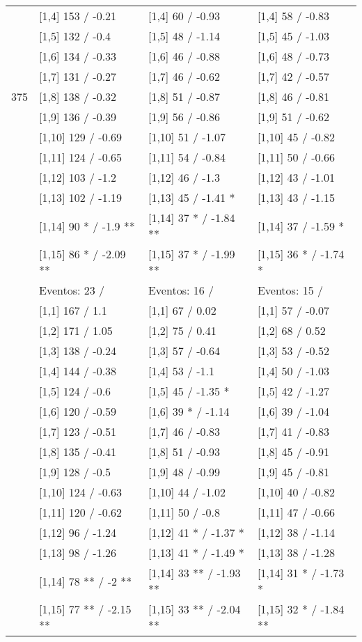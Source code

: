 \begin{table}
\begin{tabular}[t]{llll}
\addlinespace
 & {}[1,4] 153  / -0.21 & {}[1,4] 60  / -0.93 & {}[1,4] 58  / -0.83\\
 & {}[1,5] 132  / -0.4 & {}[1,5] 48  / -1.14 & {}[1,5] 45  / -1.03\\
 & {}[1,6] 134  / -0.33 & {}[1,6] 46  / -0.88 & {}[1,6] 48  / -0.73\\
 & {}[1,7] 131  / -0.27 & {}[1,7] 46  / -0.62 & {}[1,7] 42  / -0.57\\
375 & {}[1,8] 138  / -0.32 & {}[1,8] 51  / -0.87 & {}[1,8] 46  / -0.81\\
\addlinespace
 & {}[1,9] 136  / -0.39 & {}[1,9] 56  / -0.86 & {}[1,9] 51  / -0.62\\
 & {}[1,10] 129  / -0.69 & {}[1,10] 51  / -1.07 & {}[1,10] 45  / -0.82\\
 & {}[1,11] 124  / -0.65 & {}[1,11] 54  / -0.84 & {}[1,11] 50  / -0.66\\
 & {}[1,12] 103  / -1.2 & {}[1,12] 46  / -1.3 & {}[1,12] 43  / -1.01\\
 & {}[1,13] 102  / -1.19 & {}[1,13] 45  / -1.41 * & {}[1,13] 43  / -1.15\\
\addlinespace
 & {}[1,14] 90 * / -1.9 ** & {}[1,14] 37 * / -1.84 ** & {}[1,14] 37  / -1.59 *\\
 & {}[1,15] 86 * / -2.09 ** & {}[1,15] 37 * / -1.99 ** & {}[1,15] 36 * / -1.74 *\\
 & Eventos:  23 / & Eventos:  16 / & Eventos:  15 /\\
 & {}[1,1] 167  / 1.1 & {}[1,1] 67  / 0.02 & {}[1,1] 57  / -0.07\\
 & {}[1,2] 171  / 1.05 & {}[1,2] 75  / 0.41 & {}[1,2] 68  / 0.52\\
\addlinespace
 & {}[1,3] 138  / -0.24 & {}[1,3] 57  / -0.64 & {}[1,3] 53  / -0.52\\
 & {}[1,4] 144  / -0.38 & {}[1,4] 53  / -1.1 & {}[1,4] 50  / -1.03\\
 & {}[1,5] 124  / -0.6 & {}[1,5] 45  / -1.35 * & {}[1,5] 42  / -1.27\\
 & {}[1,6] 120  / -0.59 & {}[1,6] 39 * / -1.14 & {}[1,6] 39  / -1.04\\
 & {}[1,7] 123  / -0.51 & {}[1,7] 46  / -0.83 & {}[1,7] 41  / -0.83\\
\addlinespace
500 & {}[1,8] 135  / -0.41 & {}[1,8] 51  / -0.93 & {}[1,8] 45  / -0.91\\
 & {}[1,9] 128  / -0.5 & {}[1,9] 48  / -0.99 & {}[1,9] 45  / -0.81\\
 & {}[1,10] 124  / -0.63 & {}[1,10] 44  / -1.02 & {}[1,10] 40  / -0.82\\
 & {}[1,11] 120  / -0.62 & {}[1,11] 50  / -0.8 & {}[1,11] 47  / -0.66\\
 & {}[1,12] 96  / -1.24 & {}[1,12] 41 * / -1.37 * & {}[1,12] 38  / -1.14\\
\addlinespace
 & {}[1,13] 98  / -1.26 & {}[1,13] 41 * / -1.49 * & {}[1,13] 38  / -1.28\\
 & {}[1,14] 78 ** / -2 ** & {}[1,14] 33 ** / -1.93 ** & {}[1,14] 31 * / -1.73 *\\
 & {}[1,15] 77 ** / -2.15 ** & {}[1,15] 33 ** / -2.04 ** & {}[1,15] 32 * / -1.84 **\\
\bottomrule
\end{tabular}
\end{table}
